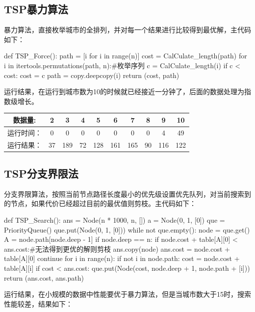 \documentclass[paper=a4,margin=0.5cm]{scrartcl} %
\begin{document}
\subsection{TSP暴力算法}

\indent 暴力算法，直接枚举城市的全排列，并对每一个结果进行比较得到最优解，主代码如下：\\
\begin{python}
def TSP_Force():
	path = [i for i in range(n)]
	cost = CalCulate_length(path)
	for i in itertools.permutations(path, n):#枚举序列
		c = CalCulate_length(i)
		if c < cost:
			cost = c
			path = copy.deepcopy(i)
	return (cost, path)
\end{python}

\indent 运行结果，在运行到城市数为10的时候就已经接近一分钟了，后面的数据处理为指数级增长。\\

\begin{tabular}{cccccccccc}
	\hline 
	数据量: & 2 & 3 & 4 &5 &6 &7 &8 &9 &10 \\ 
	\hline 
	运行时间：&0 &0 &0 &0 &0 &0 &0 &4 &49 \\ 
	\hline 
	运行结果：&37 &189 &72 &128 &161 &165 &90 &116 &122\\ 
	\hline 
\end{tabular} 



\subsection{TSP分支界限法}

\indent 分支界限算法，按照当前节点路径长度最小的优先级设置优先队列，对当前搜索到的节点，如果代价已经超过目前的最优值则剪枝。主代码如下：\\
\begin{python}
def TSP_Search():
	ans = Node(n * 1000, n, [])
	a = Node(0, 1, [0])
	que = PriorityQueue()
	que.put(Node(0, 1, [0]))
	while not que.empty():
		node = que.get()
		A = node.path[node.deep - 1]
		if node.deep == n:
			if node.cost + table[A][0] < ans.cost:#无法得到更优的解则剪枝
				ans.copy(node)
				ans.cost = node.cost + table[A][0]
			continue
		for i in range(n):
			if not i in node.path:
				cost = node.cost + table[A][i]
				if cost < ans.cost:
					que.put(Node(cost, node.deep + 1, node.path + [i]))
	return (ans.cost, ans.path)
\end{python}

\indent 运行结果，在小规模的数据中性能要优于暴力算法，但是当城市数大于15时，搜索性能较差，结果如下：\\
\end{document}

